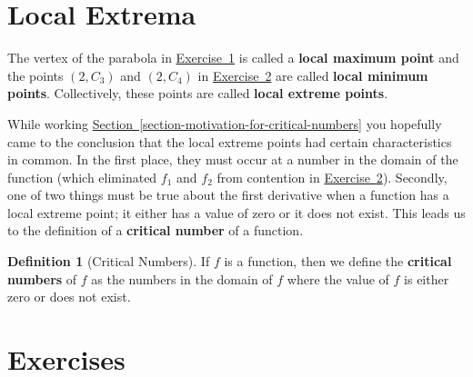 \documentclass[12pt,]{book}
\newcommand{\terminology}[1]{\textbf{#1}}
\theoremstyle{plain}
\theoremstyle{definition}
\newtheorem{definition}[theorem]{Definition}
\numberwithin{equation}{section}
\newcommand{\point}[2]{\left(#1,#2\right)}
\begin{document}
\section[Local Extrema]{Local Extrema}\label{section-local-extrema}
The vertex of the parabola in \hyperref[exercise-parabola-vertex]{Exercise~1} is called a \terminology{local maximum point} and the points \(\point{2}{C_3}\) and \(\point{2}{C_4}\) in \hyperref[exercise-distinguish-graphs-by-critical-nature]{Exercise~2} are called \terminology{local minimum points}.  Collectively, these points are called \terminology{local extreme points}.%
\par
While working \hyperref[section-motivation-for-critical-numbers]{Section~\ref*{section-motivation-for-critical-numbers}} you hopefully came to the conclusion that the local extreme points had certain characteristics in common.  In the first place, they must occur at a number in the domain of the function (which eliminated \(f_1\) and \(f_2\) from contention in \hyperref[exercise-distinguish-graphs-by-critical-nature]{Exercise~2}).  Secondly, one of two things must be true about the first derivative when a function has a local extreme point; it either has a value of zero or it does not exist.  This leads us to the definition of a \terminology{critical number} of a function.%
\begin{definition}[Critical Numbers]\label{definition-critical-numbers}
If \(f\) is a function, then we define the \terminology{critical numbers} of \(f\) as the numbers in the domain of \(f\) where the value of \(f\) is either zero or does not exist.%
\end{definition}
\typeout{************************************************}
\typeout{************************************************}
\section*{Exercises}\label{exercises-2}
\end{document}
